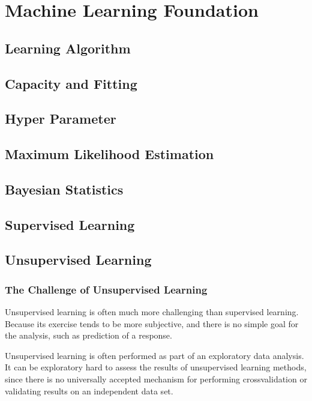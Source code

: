 
\chapter{Machine Learning Foundation}

\section{Learning Algorithm}

\section{Capacity and Fitting}

\section{Hyper Parameter}


\section{Maximum Likelihood Estimation}


\section{Bayesian Statistics}


\section{Supervised Learning}


\section{Unsupervised Learning}

\subsection{The Challenge of Unsupervised Learning}
Unsupervised learning is often much more challenging than supervised learning. Because its exercise tends to be more subjective, and there is no simple goal for the analysis, such as prediction of a response. 

Unsupervised learning is often performed as part of an exploratory data analysis. It can be exploratory hard to assess the results of unsupervised learning methods, since there is no universally accepted mechanism for performing crossvalidation or validating results on an independent data set. 


